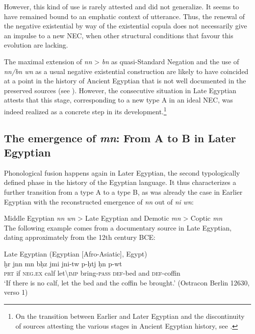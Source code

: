 \documentclass[output=paper,draft,draftmode,colorlinks,citecolor=brown]{langscibook}
\begin{document}
However, this kind of use is rarely attested and did not generalize. It seems to have remained bound to an emphatic context of utterance. Thus, the renewal of the negative existential by way of the existential copula does not necessarily give an impulse to a new NEC, when other structural conditions that favour this evolution are lacking.  
 
The maximal extension of \textit{nn} > \textit{bn} as quasi-Standard Negation and the use of \textit{nn/bn wn} as a usual negative existential construction are likely to have coincided at a point in the history of Ancient Egyptian that is not well documented in the preserved sources (see ). However, the consecutive situation in Late Egyptian attests that this stage, corresponding to a new type A in an ideal NEC, was indeed realized as a concrete step in its development.\footnote{On the transition between Earlier and Later Egyptian and the discontinuity of sources attesting the various stages in Ancient Egyptian history, see \citet{Zoller-Engelhardt2016}.}

\subsection{The emergence of \textit{mn}: From A to B in Later Egyptian}\label{s:AE2-6}

Phonological fusion happens again in Later Egyptian, the second typologically defined phase in the history of the Egyptian language. It thus characterizes a further transition from a type A to a type B, as was already the case in Earlier Egyptian with the reconstructed emergence of \textit{nn} out of \textit{ni wn}:  
 
\ea Middle Egyptian \textit{nn wn} > Late Egyptian and Demotic \textit{mn} > Coptic \textit{mn} \label{gen:path}\\
 \z
The following example comes from a documentary source in Late Egyptian, dating approximately from the 12th century BCE: 
 
\ea Late Egyptian (Egyptian [Afro-Asiatic], Egypt) \label{ex:AE44}\\
    \gll ḫr jnn mn bḥz jmi jni-tw p{\ꜣ}-ḥ{\ꜥ}tj ḥn{\ꜥ} p{\ꜣ}-wt \\
    \textsc{prt} if \textsc{neg.ex} calf let\textbackslash\textsc{imp} bring-\textsc{pass} \textsc{def}-bed and \textsc{def}-coffin\\ 
    \glt ‘If there is no calf, let the bed and the coffin be brought.’ (Ostracon Berlin 12630, verso 1) 
\z 
\end{document}
